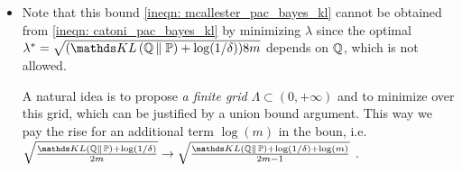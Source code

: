 \documentclass[11pt]{article}
\begin{document}
\begin{itemize}
\begin{proof}
\begin{align*}
\log \E{\bP}{e^{\lambda M}} &= \sup_{\bQ \ll \bP}\set{\E{\bQ}{ \lambda M} - \kl{\bQ}{\bP} }
\end{align*} and let $M:= \Delta^2$ and $\lambda := (2m-1)$, so that  we have
\begin{align}
\E{\cD}{e^{ \sup_{\bQ \ll \bP}\set{\E{\bQ}{ (2m-1) \Delta^2} - \kl{\bQ}{\bP}}}}  &\le \E{\cD}{\E{\bP}{e^{(2m-1) \Delta(h)^2}}} \nonumber \\
&\le \E{\bP}{\E{\cD}{e^{(2m-1) \Delta(h)^2}}} \nonumber\\
&\le 4m  \quad \text{(by bound \eqref{pf: mcallester_pac_bayes_kl_1})}.  \label{pf: mcallester_pac_bayes_kl_2}
\end{align} By Markov's inequality
\begin{align*}
&\cP\set{\sup_{\bQ \ll \bP}\set{\E{\bQ}{ (2m-1) \Delta^2} - \kl{\bQ}{\bP}} \ge \epsilon} \\
&\le e^{-\epsilon} \E{\cD}{e^{ \sup_{\bQ \ll \bP}\set{\E{\bQ}{ (2m-1) \Delta^2} - \kl{\bQ}{\bP}}}}\\
&\le 4m e^{-\epsilon}.
\end{align*} Denote the RHS as $\delta$, so $\epsilon = \log(4m/\delta)$. We have with probability as least $1-\delta$, for all $\bQ \ll \bP$,
\begin{align*}
(2m-1) \E{\bQ}{\Delta^2} - \kl{\bQ}{\bP} \le \log\frac{4m}{\delta}\\
\Rightarrow \paren{\E{\bQ}{\Delta}}^2 \le \E{\bQ}{\Delta^2} \le \frac{\kl{\bQ}{\bP} + \log(1/\delta) + \log(m) + 2}{2m-1}
\end{align*} The leftmost inequality is due to Jenson's inequality on $\phi(x) := x^2$. We have proved the result. \qed
\end{proof}

\item \begin{remark}
Note that this bound  \eqref{ineqn: mcallester_pac_bayes_kl} cannot be obtained from \eqref{ineqn: catoni_pac_bayes_kl} by minimizing $\lambda$ since the optimal $\lambda^{*}= \sqrt{(\kl{\bQ}{\bP}  + \log(1/\delta)) 8m}$ depends on ${\mathbb Q}$, which is not allowed. 

A natural idea is to propose \emph{a finite grid} $\Lambda \subset (0, +\infty)$ and to minimize over this grid, which can be justified by a union bound argument. This way we pay the rise for an additional term $\log(m)$ in the boun, i.e. $\sqrt{\frac{ \kl{\bQ}{\bP}  + \log(1/\delta)}{2m }}  \to \sqrt{\frac{ \kl{\bQ}{\bP}  + \log(1/\delta) + \log(m)}{2m - 1}}$ .
\end{remark}



\end{itemize}
\end{document}
